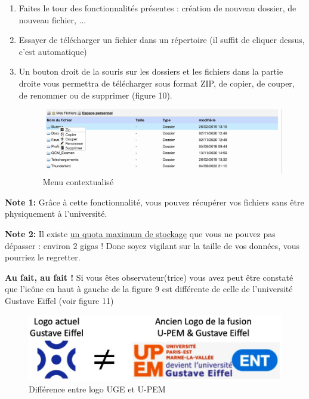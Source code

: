 \documentclass{article}
\begin{document}
\begin{exercice}
\begin{enumerate}
\item Faites le tour des fonctionnalités présentes : création de nouveau dossier, de nouveau fichier, ...  

\item Essayer de télécharger un fichier dans un répertoire (il suffit de cliquer dessus, c'est automatique)

\item Un bouton droit de la souris sur les dossiers et les fichiers dans la partie droite vous permettra de télécharger sous format ZIP, de copier, de couper, de renommer ou de supprimer (figure 10).

\begin{figure}[h!]
    \begin{center}
    \includegraphics[scale=0.2]{mesFichiersMenu.jpg}
    \caption{Menu contextualisé}
     \end{center}
\end{figure}    
      
\end{enumerate}

\textbf{Note 1: } Grâce à cette fonctionnalité,   vous pouvez récupérer vos fichiers
sans être physiquement à l'université.

\medskip

\textbf{Note 2: } Il existe \underline{un quota maximum de stockage} que vous ne pouvez pas dépasser : environ 2 gigas ! Donc soyez vigilant sur la taille de vos données, vous pourriez le regretter.

\medskip

\textbf{Au fait, au fait ! } Si vous êtes observateur(trice) vous avez peut être constaté que l'icône en haut à gauche de la figure 9 est différente de celle de l'université Gustave Eiffel (voir figure 11)

\begin{figure}[h!]
    \begin{center}
    \includegraphics[scale=0.2]{UGEvsUPEM.jpg}
    \caption{Différence entre logo UGE et U-PEM}
     \end{center}
\end{figure}    


\end{exercice}
\end{document}
